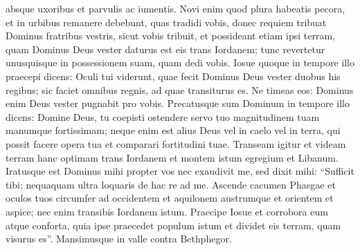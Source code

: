 \begin{biblechapter}
\verse absque uxoribus et parvulis ac iumentis. Novi enim quod plura habeatis pecora, et in urbibus remanere debebunt, quas tradidi vobis,  
\verse donec requiem tribuat Dominus fratribus vestris, sicut vobis tribuit, et possideant etiam ipsi terram, quam Dominus Deus vester daturus est eis trans Iordanem; tunc revertetur unusquisque in possessionem suam, quam dedi vobis. 
\verse Iosue quoque in tempore illo praecepi dicens: Oculi tui viderunt, quae fecit Dominus Deus vester duobus his regibus; sic faciet omnibus regnis, ad quae transiturus es. 
\verse Ne timeas eos: Dominus enim Deus vester pugnabit pro vobis. 
\verse Precatusque sum Dominum in tempore illo dicens: 
\verse Domine Deus, tu coepisti ostendere servo tuo magnitudinem tuam manumque fortissimam; neque enim est alius Deus vel in caelo vel in terra, qui possit facere opera tua et comparari fortitudini tuae. 
\verse Transeam igitur et videam terram hanc optimam trans Iordanem et montem istum egregium et Libanum. 
\verse Iratusque est Dominus mihi propter vos nec exaudivit me, sed dixit mihi: “Sufficit tibi; nequaquam ultra loquaris de hac re ad me. 
\verse Ascende cacumen Phasgae et oculos tuos circumfer ad occidentem et aquilonem austrumque et orientem et aspice; nec enim transibis Iordanem istum. 
\verse Praecipe Iosue et corrobora eum atque conforta, quia ipse praecedet populum istum et dividet eis terram, quam visurus es”. 
\verse Mansimusque in valle contra Bethphegor. 
\end{biblechapter}


